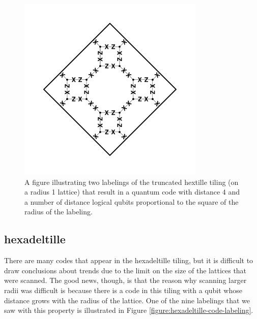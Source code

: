 \documentclass[12pt]{amsbook}
\theoremstyle{plain}
\theoremstyle{definition}
\theoremstyle{remark}
\begin{document}
\begin{figure}
\includegraphics[width=3.5in]{images/truncated-quadrille-code-4-labeling-1} %
\caption{
\label{figure:truncated-hextille-code-4-labelings}
A figure illustrating two labelings of the truncated hextille tiling (on a radius 1 lattice) that result in a quantum code with distance 4 and a number of distance logical qubits proportional to the square of the radius of the labeling.
}
\end{figure}
\subsection{hexadeltille}

There are many codes that appear in the hexadeltille tiling, but it is difficult to draw conclusions about trends due to the limit on the size of the lattices that were scanned.  The good news, though, is that the reason why scanning larger radii was difficult is because there is a code in this tiling with a qubit whose distance grows with the radius of the lattice.  One of the nine labelings that we saw with this property is illustrated in Figure \ref{figure:hexadeltille-code-labeling}. 
\end{document}
